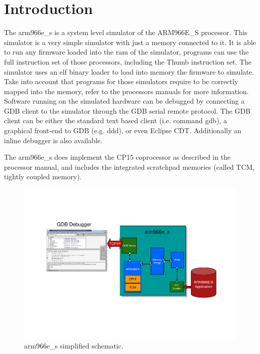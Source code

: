 \section{Introduction}

The arm966e\_s is a system level simulator of the ARM966E\_S processor. This simulator is a very simple simulator with just a memory connected to it. It is able to run any firmware loaded into the ram of the simulator, programs can use the full instruction set of those processors, including the Thumb instruction set. The simulator uses an elf binary loader to load into memory the firmware to simulate. Take into account that programs for those simulators require to be correctly mapped into the memory, refer to the processors manuals for more information. Software running on the simulated hardware can be debugged by connecting a GDB client to the simulator through the GDB serial remote protocol. The GDB client can be either the standard text based client (i.e. command gdb), a graphical front-end to GDB (e.g. ddd), or even Eclipse CDT. Additionally an inline debugger is also available.

The arm966e\_s does implement the CP15 coprocessor as described in the processor manual, and includes the integrated scratchpad memories (called TCM, tightly coupled memory). 

\begin{figure}[!h]
	\begin{center}
		\includegraphics[width=\textwidth]{arm966e_s/fig_arm966e_s.pdf}
	\end{center}
	\caption{arm966e\_s simplified schematic.}
	\label{fig:arm966e_s}
\end{figure}

